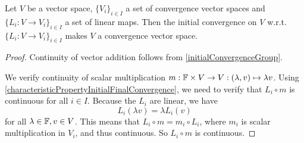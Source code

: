 \begin{proposition} \label{initialVectorSpaceConvergence}
Let $V$ be a vector space, $\{V_i\}_{i\in I}$ a set of convergence vector spaces and $\{L_i: V \to V_i\}_{i\in I}$ a set of linear maps. Then the initial convergence on $V$ w.r.t. $\{L_i: V \to V_i\}_{i\in I}$ makes $V$ a convergence vector space.
\end{proposition}
\begin{proof}
Continuity of vector addition follows from \ref{initialConvergenceGroup}.

We verify continuity of scalar multiplication $m: \mathbb{F}\times V \to V: (\lambda, v) \mapsto \lambda v$. Using \ref{characteristicPropertyInitialFinalConvergence}, we need to verify that $L_i\circ m$ is continuous for all $i\in I$. Because the $L_i$ are linear, we have
\[ L_i(\lambda v) = \lambda L_i(v) \]
for all $\lambda \in \mathbb{F}, v \in V$. This means that $L_i\circ m = m_i \circ L_i$, where $m_i$ is scalar multiplication in $V_i$, and thus continuous. So $L_i \circ m$ is continuous.
\end{proof}


